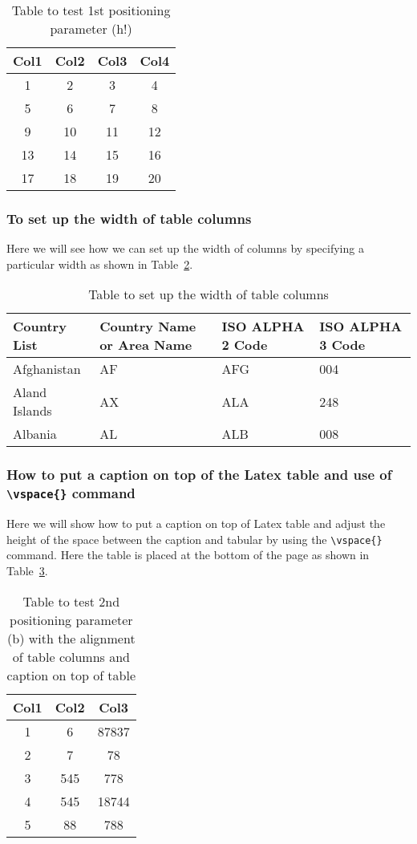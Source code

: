 \documentclass{article}
\begin{document}
\begin{table}[h!]
\centering
\begin{tabular}{||c c c c||}
\hline

Col1 & Col2 & Col3 & Col4 \\
\hline
\hline
1 & 2 & 3 & 4 \\
5 & 6 & 7 & 8 \\
9 & 10 & 11 & 12 \\
13 & 14 & 15 & 16 \\
17 & 18 & 19 & 20 \\
\hline
\end{tabular}
\caption{Table to test 1st positioning parameter (h!)}
\label{tab:sample5}
\end{table}

\subsubsection{To set up the width of table columns}
Here we will see how we can set up the width of columns by specifying a particular width as shown in Table~\ref{tab:sample6}.

\begin{table}[h!]
\centering
\begin{tabular}{|l|l|l|l|}
\hline
Country List & Country Name or Area Name & ISO ALPHA 2 Code & ISO ALPHA 3 Code \\
\hline
Afghanistan & AF & AFG & 004 \\
Aland Islands & AX & ALA & 248 \\
Albania & AL & ALB & 008 \\
\hline
\end{tabular}
\caption{Table to set up the width of table columns}
\label{tab:sample6}
\end{table}

\subsubsection{How to put a caption on top of the Latex table and use of \texttt{\textbackslash vspace\{\}} command}
Here we will show how to put a caption on top of Latex table and adjust the height of the space between the caption and tabular by using the \texttt{\textbackslash vspace\{\}} command. Here the table is placed at the bottom of the page as shown in Table~\ref{tab:sample7}.

\begin{table}[b]
\centering
\vspace{1cm}
\begin{tabular}{|c|c|c|}
\hline
Col1 & Col2 & Col3 \\
\hline
1 & 6 & 87837 \\
2 & 7 & 78 \\
3 & 545 & 778 \\
4 & 545 & 18744 \\
5 & 88 & 788 \\
\hline
\end{tabular}
\caption{Table to test 2nd positioning parameter (b) with the alignment of table columns and caption on top of table}
\label{tab:sample7}
\end{table}
\end{document}
